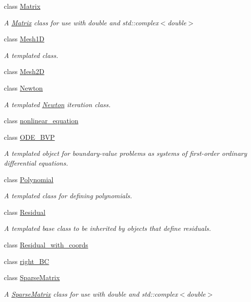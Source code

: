 \begin{DoxyCompactItemize}
class \hyperlink{classLuna_1_1Matrix}{Matrix}
\begin{DoxyCompactList}\small\item\em A \hyperlink{classLuna_1_1Matrix}{Matrix} class for use with double and std\+::complex$<$double$>$ \end{DoxyCompactList}\item 
class \hyperlink{classLuna_1_1Mesh1D}{Mesh1D}
\begin{DoxyCompactList}\small\item\em A templated class. \end{DoxyCompactList}\item 
class \hyperlink{classLuna_1_1Mesh2D}{Mesh2D}
\item 
class \hyperlink{classLuna_1_1Newton}{Newton}
\begin{DoxyCompactList}\small\item\em A templated \hyperlink{classLuna_1_1Newton}{Newton} iteration class. \end{DoxyCompactList}\item 
class \hyperlink{classLuna_1_1nonlinear__equation}{nonlinear\+\_\+equation}
\item 
class \hyperlink{classLuna_1_1ODE__BVP}{O\+D\+E\+\_\+\+B\+VP}
\begin{DoxyCompactList}\small\item\em A templated object for boundary-\/value problems as systems of first-\/order ordinary differential equations. \end{DoxyCompactList}\item 
class \hyperlink{classLuna_1_1Polynomial}{Polynomial}
\begin{DoxyCompactList}\small\item\em A templated class for defining polynomials. \end{DoxyCompactList}\item 
class \hyperlink{classLuna_1_1Residual}{Residual}
\begin{DoxyCompactList}\small\item\em A templated base class to be inherited by objects that define residuals. \end{DoxyCompactList}\item 
class \hyperlink{classLuna_1_1Residual__with__coords}{Residual\+\_\+with\+\_\+coords}
\item 
class \hyperlink{classLuna_1_1right__BC}{right\+\_\+\+BC}
\item 
class \hyperlink{classLuna_1_1SparseMatrix}{Sparse\+Matrix}
\begin{DoxyCompactList}\small\item\em A \hyperlink{classLuna_1_1SparseMatrix}{Sparse\+Matrix} class for use with double and std\+::complex$<$double$>$ \end{DoxyCompactList}\item 

\end{DoxyCompactItemize}
